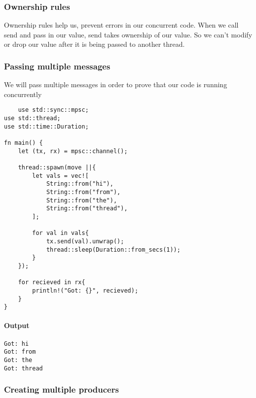 \subsubsection{Ownership rules}
Ownership rules help us, prevent errors in our concurrent code. When we call send and pass in our value, send takes ownership of our value. So we can't modify or drop our value after it is being passed to another thread.

\subsubsection{Passing multiple messages}
We will pass multiple messages in order to prove that our code is running concurrently
\begin{lstlisting}
    use std::sync::mpsc;
use std::thread;
use std::time::Duration;

fn main() {
    let (tx, rx) = mpsc::channel();

    thread::spawn(move ||{ 
        let vals = vec![
            String::from("hi"),
            String::from("from"),
            String::from("the"),
            String::from("thread"),
        ];

        for val in vals{
            tx.send(val).unwrap();
            thread::sleep(Duration::from_secs(1));
        }
    });

    for recieved in rx{ 
        println!("Got: {}", recieved);
    }
}
\end{lstlisting}

\paragraph*{Output}\begin{lstlisting}
Got: hi
Got: from
Got: the
Got: thread
\end{lstlisting}

\subsubsection{Creating multiple producers}

